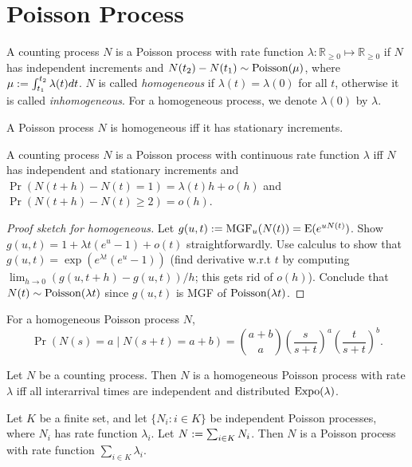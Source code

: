 \documentclass[a4paper, 12pt, fleqn]{article}
\DeclareMathOperator{\MGF}{MGF}
\DeclareMathOperator{\Poisson}{\opname{Poisson}}
\DeclareMathOperator{\Expo}{\opname{Expo}}
\begin{document}
\section{Poisson Process}

\begin{definition}
A counting process $N$ is a Poisson process with rate function
$\lambda: \mathbb{R}_{\ge 0} \mapsto \mathbb{R}_{\ge 0}$ if
$N$ has independent increments and $N(t_2)-N(t_1) \sim \Poisson(\mu)$,
where $\mu := \int_{t_1}^{t_2} \lambda(t) dt$.
$N$ is called \emph{homogeneous} if $\lambda(t) = \lambda(0)$ for all $t$,
otherwise it is called \emph{inhomogeneous}.
For a homogeneous process, we denote $\lambda(0)$ by $\lambda$.
\end{definition}

\begin{lemma}
A Poisson process $N$ is homogeneous iff it has stationary increments.
\end{lemma}

\begin{theorem}
A counting process $N$ is a Poisson process with continuous rate function $\lambda$ iff
$N$ has independent and stationary increments and
$\Pr(N(t+h)-N(t) = 1) = \lambda(t) h + o(h)$ and $\Pr(N(t+h)-N(t) \ge 2) = o(h)$.
\end{theorem}
\begin{proof}[Proof sketch for homogeneous]
Let $g(u,t) \defeq \MGF_u(N(t)) = \E(e^{uN(t)})$.
Show $g(u,t) = 1 + \lambda t(e^u-1) + o(t)$ straightforwardly.
Use calculus to show that $g(u,t) = \exp(e^{\lambda t}(e^u-1))$
(find derivative w.r.t $t$ by computing $\lim_{h \to 0} (g(u,t+h)-g(u,t))/h$; this gets rid of $o(h)$).
Conclude that $N(t) \sim \Poisson(\lambda t)$ since $g(u,t)$ is MGF of $\Poisson(\lambda t)$.
\end{proof}

\begin{lemma}
For a homogeneous Poisson process $N$,
\[ \Pr(N(s)=a \mid N(s+t)=a+b) = \binom{a+b}{a}\left(\frac{s}{s+t}\right)^a\left(\frac{t}{s+t}\right)^b. \]
\end{lemma}

\begin{theorem}
Let $N$ be a counting process. Then $N$ is a homogeneous Poisson process with rate $\lambda$
iff all interarrival times are independent and distributed $\Expo(\lambda)$.
\end{theorem}

\begin{theorem}
Let $K$ be a finite set, and let $\{N_i: i \in K\}$ be independent Poisson processes,
where $N_i$ has rate function $\lambda_i$. Let $N := \sum_{i \in K}N_i$.
Then $N$ is a Poisson process with rate function $\sum_{i \in K} \lambda_i$.
\end{theorem}
\end{document}
